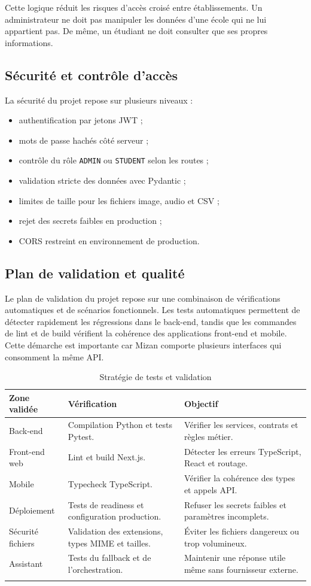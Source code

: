 \documentclass{rapportENSET}
\begin{document}
Cette logique réduit les risques d'accès croisé entre établissements. Un administrateur ne doit pas manipuler les données d'une école qui ne lui appartient pas. De même, un étudiant ne doit consulter que ses propres informations.

\subsection{Sécurité et contrôle d'accès}
La sécurité du projet repose sur plusieurs niveaux :
\begin{itemize}
    \item authentification par jetons JWT ;
    \item mots de passe hachés côté serveur ;
    \item contrôle du rôle \texttt{ADMIN} ou \texttt{STUDENT} selon les routes ;
    \item validation stricte des données avec Pydantic ;
    \item limites de taille pour les fichiers image, audio et CSV ;
    \item rejet des secrets faibles en production ;
    \item CORS restreint en environnement de production.
\end{itemize}

\subsection{Plan de validation et qualité}
Le plan de validation du projet repose sur une combinaison de vérifications automatiques et de scénarios fonctionnels. Les tests automatiques permettent de détecter rapidement les régressions dans le back-end, tandis que les commandes de lint et de build vérifient la cohérence des applications front-end et mobile. Cette démarche est importante car Mizan comporte plusieurs interfaces qui consomment la même API.

\begin{longtable}{@{}L{0.24\textwidth}L{0.34\textwidth}L{0.32\textwidth}@{}}
\toprule
\textbf{Zone validée} & \textbf{Vérification} & \textbf{Objectif} \\
\midrule
\endhead
Back-end & Compilation Python et tests Pytest. & Vérifier les services, contrats et règles métier. \\
Front-end web & Lint et build Next.js. & Détecter les erreurs TypeScript, React et routage. \\
Mobile & Typecheck TypeScript. & Vérifier la cohérence des types et appels API. \\
Déploiement & Tests de readiness et configuration production. & Refuser les secrets faibles et paramètres incomplets. \\
Sécurité fichiers & Validation des extensions, types MIME et tailles. & Éviter les fichiers dangereux ou trop volumineux. \\
Assistant & Tests du fallback et de l'orchestration. & Maintenir une réponse utile même sans fournisseur externe. \\
\bottomrule
\caption{Stratégie de tests et validation}
\end{longtable}
\end{document}
